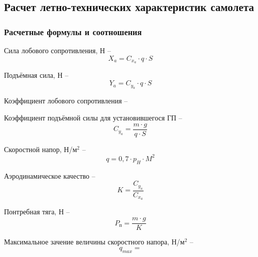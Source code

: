 \subsection{Расчет летно-технических характеристик самолета}
\label{sec:Расчет летно-технических характеристик самолета}
\subsubsection{Расчетные формулы и соотношения}
\pagestyle{fancy}
\fancyhf{}
\rfoot{\thepage}


Сила лобового сопротивления, Н -- 
\begin{equation}
    \label{eq:Сила лобового сопротивления}
    X_a = C_{x_a} \cdot q \cdot S
\end{equation}

Подъёмная сила, Н -- 
\begin{equation}
    \label{eq:Подъёмная сила}
    Y_a = C_{y_a} \cdot q \cdot S
\end{equation}

Коэффициент лобового сопротивления -- 
\begin{equation}
    \label{eq:коэффициент лобового сопротивления}
\end{equation}

Коэффициент подъёмной силы для установившегося ГП -- 
\begin{equation}
    \label{eq:Коэффициент подъёмной силы для установившегося ГП}
    C_{y_a} = \frac{m \cdot g}{q \cdot S}
\end{equation}

Скоростной напор, Н/м$^2$ -- 
\begin{equation}
    \label{eq:Скоростной напор}
    q = 0,7 \cdot p_H \cdot M^2
\end{equation}

Аэродинамическое качество -- 
\begin{equation}
    \label{eq:Аэродинамическое качество}
    K = \frac{C_{y_a}}{C_{x_a}}
\end{equation}

Понтребная тяга, Н -- 
\begin{equation}
    \label{eq:Понтребная тяга}
    P_\text{п} = \frac{m \cdot g}{K}
\end{equation}

Максимальное зачение величины скоростного напора, Н/м$^2$ --
\begin{equation}
    \label{eq:Максимальное зачение величины скоростного напора}
    q_{max} = 
\end{equation}

